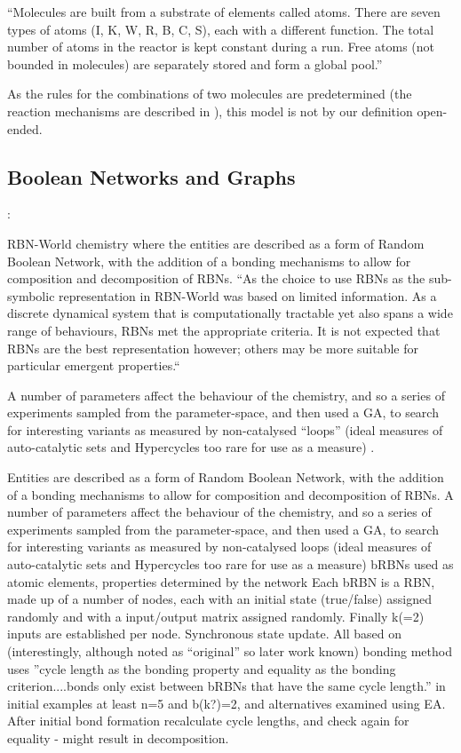 ``Molecules are built from a substrate of elements called atoms. There are seven types of atoms (I, K, W, R, B, C, S), each with a different function. The total number of atoms in the reactor is kept constant during a run. Free atoms (not bounded in molecules) are separately stored and form a global pool.''

As the rules for the combinations of two molecules are predetermined (the reaction mechanisms are described in \cite{Fenizio2000}), this model is not by our definition open-ended.

\subsection{Boolean Networks and Graphs}

\parencite{Faulconbridge2010, Faulconbridge2011}:

RBN-World \cite{Faulconbridge2011} chemistry where the entities are described as a form of Random Boolean Network, with the addition of a bonding mechanisms to allow for composition and decomposition of RBNs. ``As the choice to use RBNs as the sub-symbolic representation in RBN-World was based on limited information. As a discrete dynamical system that is computationally tractable yet also spans a wide range of behaviours, RBNs met the appropriate criteria. It is not expected that RBNs are the best representation however; others may be more suitable for particular emergent properties.``

A number of parameters affect the behaviour of the chemistry, and so a series of experiments sampled from the parameter-space, and then used a GA, to search for interesting variants as measured by non-catalysed ``loops'' (ideal measures of auto-catalytic sets and Hypercycles too rare for use as a measure) \parencite[chap.8]{Faulconbridge2011}. 

Entities are described as a form of Random Boolean Network, with the addition of a bonding mechanisms to allow for composition and decomposition of RBNs. A number of parameters affect the behaviour of the chemistry, and so a series of experiments sampled from the parameter-space, and then used a GA, to search for interesting variants as measured by non-catalysed loops (ideal measures of auto-catalytic sets and Hypercycles too rare for use as a measure) \parencite[chap.8]{Faulconbridge2011}
bRBNs used as atomic elements, properties determined by the network
Each bRBN is a RBN, made up of a number of nodes, each with an initial state (true/false) assigned randomly and with a input/output matrix assigned randomly. Finally k(=2) inputs are established per node. Synchronous state update. All based on \cite{Kauffman:1969ne} (interestingly, although noted as ``original'' so later work known) bonding method uses ''cycle length as the bonding property and equality as the bonding criterion....bonds only exist between bRBNs that have the same cycle length.'' in initial examples at least n=5 and b(k?)=2, and alternatives examined using EA. After initial bond formation recalculate cycle lengths, and check again for equality - might result in decomposition.

